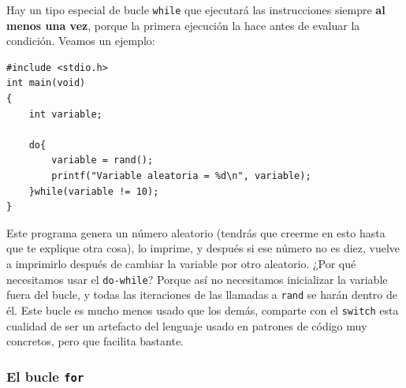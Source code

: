 \documentclass[a4paper]{article}
\begin{document}
Hay un tipo especial de bucle \texttt{while} que ejecutará las instrucciones
siempre \textbf{al menos una vez}, porque la primera ejecución la hace antes de
evaluar la condición. Veamos un ejemplo:



\noindent
\begin{minipage}[H]{\linewidth}
\mbox{}
\begin{lstlisting}[style=C,
caption={Ejemplo de programa con un bucle \texttt{do-while}},
label={lst:doWhile}]
#include <stdio.h>
int main(void)
{
    int variable;

    do{
        variable = rand();
        printf("Variable aleatoria = %d\n", variable);
    }while(variable != 10);
}
\end{lstlisting}
\end{minipage}


Este programa genera un número aleatorio (tendrás que creerme en esto hasta
que te explique otra cosa), lo imprime, y después si ese número
no es diez, vuelve a imprimirlo después de cambiar la variable por otro aleatorio.
¿Por qué necesitamos usar el \texttt{do-while}? Porque así no necesitamos
inicializar la variable fuera del bucle, y todas las iteraciones de las llamadas
a \verb!rand! se harán dentro de él.
Este bucle es mucho menos usado que los demás, comparte
con el \verb!switch! esta cualidad de ser un artefacto del lenguaje usado en
patrones de código muy concretos, pero que facilita bastante.

\subsubsection{El bucle \texttt{for}}
\end{document}
